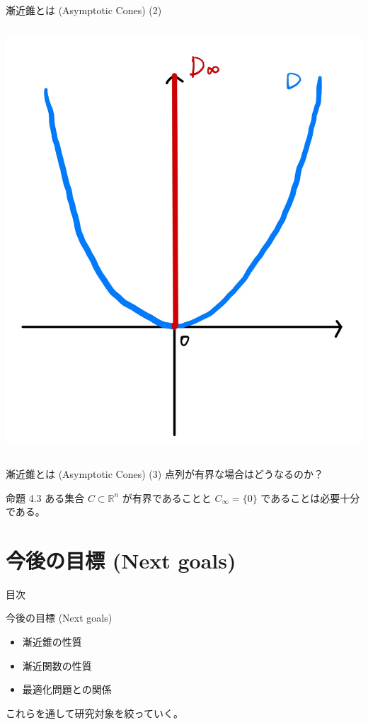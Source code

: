 \documentclass[aspectratio=169, dvipdfmx, 11pt]{beamer} %
\begin{document}
\begin{frame}{漸近錐とは (Asymptotic Cones) (2) }
\begin{columns}
\begin{column}{0.48\textwidth}
      \includegraphics[keepaspectratio, scale=0.06]{figures/example_asynptotoc_cone.jpg}
    \end{column}
  \end{columns}
\end{frame}

\begin{frame}{漸近錐とは (Asymptotic Cones) (3) }
  点列が有界な場合はどうなるのか？
  \begin{block}{命題 4.3}
    ある集合 $C \subset \mathbb{R}^n$ が有界であることと $C_\infty = \{0\}$ であることは必要十分である。
  \end{block}
\end{frame}

\section{今後の目標 (Next goals) }
\begin{frame}{目次}
    \tableofcontents[currentsection]
\end{frame}

\begin{frame}{今後の目標 (Next goals) }
    \begin{itemize}
    \item 漸近錐の性質
    \item 漸近関数の性質
    \item 最適化問題との関係
    \end{itemize}

    これらを通して研究対象を絞っていく。
\end{frame}
\end{document}
